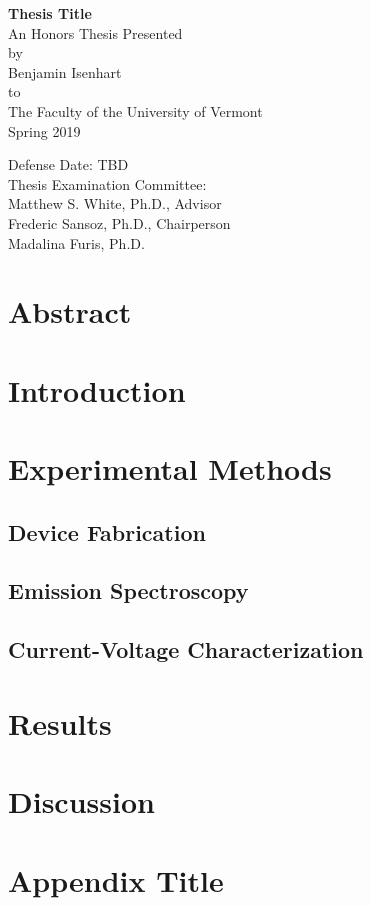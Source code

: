 \documentclass[12pt]{report}
\author{Benjamin Isenhart}
\begin{document}
\begin{titlepage}
	\begin{center}
		\vspace*{3cm}
		\Huge
		\textbf{Thesis Title}\\
		\vspace{2.5cm}
		\LARGE
		An Honors Thesis Presented\\
		by\\
		Benjamin Isenhart\\
		to\\
		The Faculty of the University of Vermont\\
		\vspace{1cm}
		Spring 2019
		\vspace{3.5cm}
	\end{center}
	\begin{flushright}
		\Large
		Defense Date: TBD\\
		Thesis Examination Committee:\\
		\vspace{1cm}
		Matthew S. White, Ph.D., Advisor\\
		Frederic Sansoz, Ph.D., Chairperson\\
		Madalina Furis, Ph.D.\\
	\end{flushright}
\end{titlepage}

\chapter*{Abstract}

\tableofcontents

\chapter{Introduction}

\chapter{Experimental Methods}

\section{Device Fabrication}

\section{Emission Spectroscopy}

\section{Current-Voltage Characterization}

\chapter{Results}

\chapter{Discussion}

\appendix
\chapter{Appendix Title}
\end{document}
